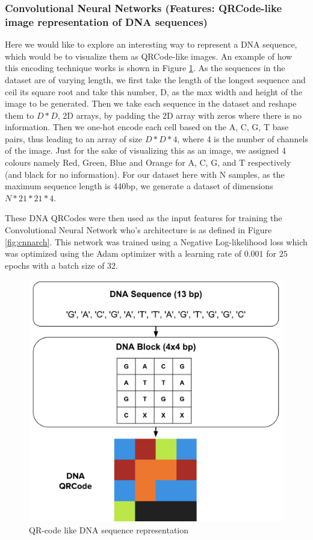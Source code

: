 \documentclass[12pt]{article}
\begin{document}
        \subsubsection{Convolutional Neural Networks (Features: QRCode-like image representation of DNA sequences)} \label{cnn}
        Here we would like to explore an interesting way to represent a DNA sequence, which would be to visualize them as QRCode-like images. An example of how this encoding technique works is shown in Figure \ref{fig:qrcode}. As the sequences in the dataset are of varying length, we first take the length of the longest sequence and ceil its square root and take this number, D, as the max width and height of the image to be generated. Then we take each sequence in the dataset and reshape them to $D * D$, 2D arrays, by padding the 2D array with zeros where there is no information. Then we one-hot encode each cell based on the A, C, G, T base pairs, thus leading to an array of size  $D * D * 4$, where 4 is the number of channels of the image. Just for the sake of visualizing this as an image, we assigned 4 colours namely Red, Green, Blue and Orange for A, C, G, and T respectively (and black for no information). For our dataset here with N samples, as the maximum sequence length is 440bp, we generate a dataset of dimensions $N * 21 * 21 * 4$.

        These DNA QRCodes were then used as the input features for training the Convolutional Neural Network who's architecture is as defined in Figure \ref{fig:cnnarch}. This network was trained using a Negative Log-likelihood loss which was optimized using the Adam optimizer with a learning rate of $0.001$ for $25$ epochs with a batch size of $32$.

        \begin{figure}[h]
        \centering
        \includegraphics[scale=0.3]{QRCode.png}
        \caption{QR-code like DNA sequence representation}
        \label{fig:qrcode}
        \end{figure}
\end{document}
